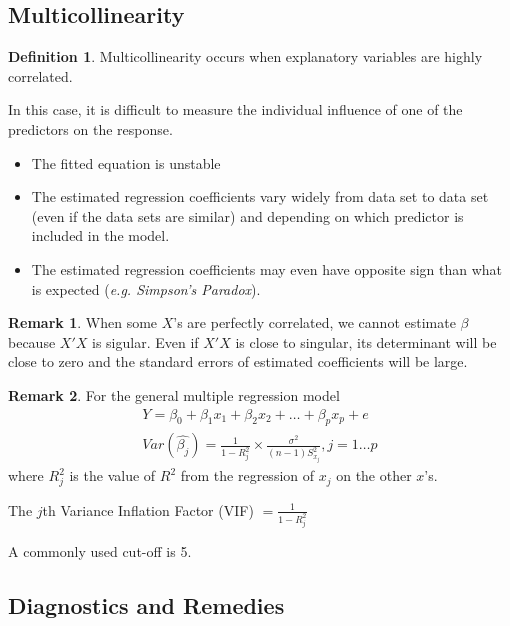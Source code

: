 \documentclass[11pt]{article}
\theoremstyle{definition}
\newtheorem{definition}{Definition}[section]
\newtheorem{remark}{Remark}[section]
\numberwithin{equation}{section}
\begin{document}
\newpage

\subsection{Multicollinearity}

\begin{definition}
  Multicollinearity occurs when explanatory variables are highly correlated.
\end{definition}
\begin{writenotes}
  In this case, it is difficult to measure the individual influence of one of the predictors on the response.
\begin{itemize}
\item The fitted equation is unstable
\item The estimated regression coefficients vary widely from data set to data set (even if the data sets are similar) and depending on which predictor is included in the model.
\item The estimated regression coefficients may even have opposite sign than what is expected (\textit{e.g. Simpson's Paradox}).
\end{itemize}
\end{writenotes}

\begin{remark}
  When some $X$'s are perfectly correlated, we cannot estimate $\beta$ because $X'X$ is sigular. Even if $X'X$ is close to singular, its determinant will be close to zero and the standard errors of estimated coefficients will be large.
\end{remark}

\begin{remark}
  For the general multiple regression model
  \begin{gather}
    Y=\beta_0+\beta_1x_1+\beta_2x_2+\dots+\beta_px_p+e\\
    Var(\hat{\beta_j}) = \frac{1}{1-R^2_j}\times\frac{\sigma^2}{(n-1)S^2_{x_j}}, j=1\dots p
  \end{gather}
  where $R_j^2$ is the value of $R^2$ from the regression of $x_j$ on the other $x$'s.
\end{remark}
\begin{writenotes}
  The $j$th Variance Inflation Factor (VIF) $=\frac{1}{1-R^2_j}$

  A commonly used cut-off is 5.
\end{writenotes}

\newpage

\subsection{Diagnostics and Remedies}
\end{document}
